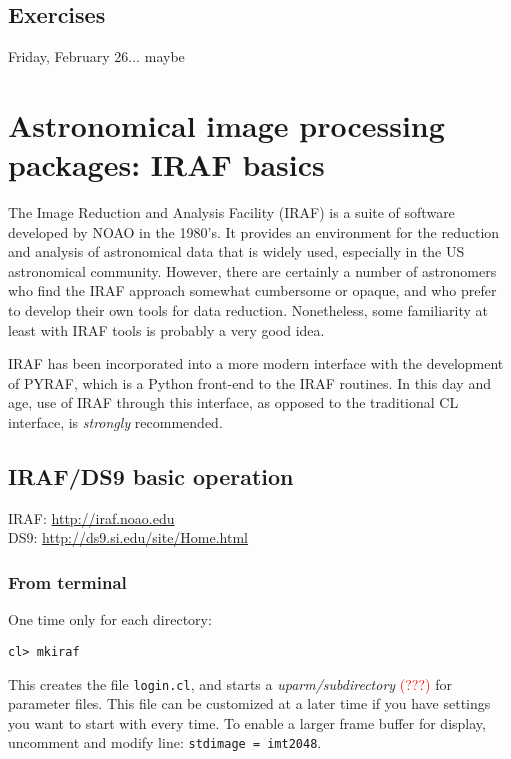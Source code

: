 \documentclass{article}
\begin{document}
\subsection*{Exercises}

\newpage\textcolor{date}{Friday, February 26$\ldots$ maybe}
\section{Astronomical image processing packages: IRAF basics}
The Image Reduction and Analysis Facility (IRAF) is a suite of
software developed by NOAO in the 1980's. It provides an environment
for the reduction and analysis of astronomical data that is widely
used, especially in the US astronomical community. However, there are
certainly a number of astronomers who find the IRAF approach somewhat
cumbersome or opaque, and who prefer to develop their own tools for
data reduction. Nonetheless, some familiarity at least with IRAF tools
is probably a very good idea.

IRAF has been incorporated into a more modern interface with the
development of PYRAF, which is a Python front-end to the IRAF
routines. In this day and age, use of IRAF through this interface, as
opposed to the traditional CL interface, is \emph{strongly}
recommended.

\subsection*{IRAF/DS9 basic operation}

IRAF: \url{http://iraf.noao.edu}\\
DS9: \url{http://ds9.si.edu/site/Home.html}
\subsubsection*{From terminal}
One time only for each directory:
\begin{verbatim}
cl> mkiraf
\end{verbatim}
This creates the file \verb|login.cl|, and starts a
\emph{uparm/subdirectory} \textcolor{red}{(???)} for parameter files.
This file can be customized at a later time if you have settings you want
to start with every time.
To enable a larger frame buffer for display, uncomment and
modify line: \verb|stdimage = imt2048|.
\end{document}
